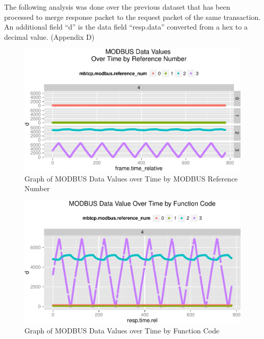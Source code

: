 \documentclass[12pt,]{article}
\begin{document}
The following analysis was done over the previous dataset that has been
processed to merge response packet to the request packet of the same
transaction. An additional field ``d'' is the data field ``resp.data''
converted from a hex to a decimal value. (Appendix D)

\begin{figure}

{\centering \includegraphics{thesis_files/figure-latex/unnamed-chunk-30-1} 

}

\caption{Graph of MODBUS Data Values over Time by MODBUS  Reference Number}\label{fig:unnamed-chunk-30}
\end{figure}

\begin{figure}

{\centering \includegraphics{thesis_files/figure-latex/unnamed-chunk-31-1} 

}

\caption{Graph of MODBUS Data Values over Time by Function Code}\label{fig:unnamed-chunk-31}
\end{figure}
\end{document}
